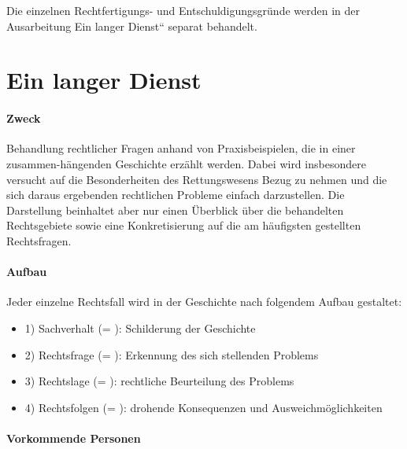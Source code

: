 Die einzelnen Rechtfertigungs- und Entschuldigungsgr\"unde werden in der
Ausarbeitung {\quotedblbase}Ein langer Dienst{\textquotedblleft}
separat behandelt.

\section{Ein langer Dienst}
{\centering
{}
\par}

\paragraph*{Zweck}

Behandlung rechtlicher Fragen anhand von Praxisbeispielen, die in einer
zusammen-hängenden Geschichte erzählt werden. Dabei wird
insbesondere versucht auf die Besonderheiten des Rettungswesens Bezug
zu nehmen und die sich daraus ergebenden rechtlichen Probleme einfach
darzustellen. Die Darstellung beinhaltet aber nur einen \"Uberblick
\"uber die behandelten Rechtsgebiete sowie eine Konkretisierung auf die
am häufigsten gestellten Rechtsfragen. 

\paragraph*{Aufbau}

Jeder einzelne Rechtsfall wird in der Geschichte nach folgendem Aufbau
gestaltet:

\begin{itemize}
\item 1) Sachverhalt (= ): Schilderung der Geschichte

\item 2) Rechtsfrage (= ): Erkennung des sich stellenden Problems

\item 3) Rechtslage (= ): rechtliche Beurteilung des Problems

\item 4) Rechtsfolgen (= ): drohende Konsequenzen und Ausweichm\"oglichkeiten

\end{itemize}

\paragraph*{Vorkommende Personen}

